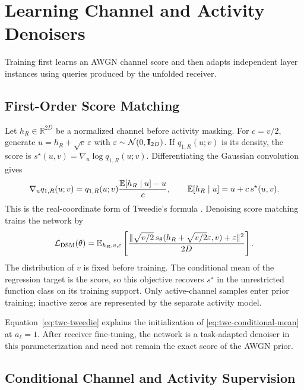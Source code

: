 \section{Learning Channel and Activity Denoisers}
\label{sec:learning}

Training first learns an AWGN channel score and then adapts independent
layer instances using queries produced by the unfolded receiver.

\subsection{First-Order Score Matching}

Let $h_R\in\mathbb R^{2D}$ be a normalized channel before activity
masking. For $c=v/2$, generate $u=h_R+\sqrt c\,\varepsilon$ with
$\varepsilon\sim\mathcal N(0,\mathbf{I}_{2D})$. If $q_{1,R}(u;v)$ is its
density, the score is $s^\star(u,v)=\nabla_u\log q_{1,R}(u;v)$.
Differentiating the Gaussian convolution gives
\begin{equation}
 \nabla_u q_{1,R}(u;v)
 =q_{1,R}(u;v)\frac{\mathbb{E}[h_R\mid u]-u}{c},\qquad
 \mathbb{E}[h_R\mid u]=u+c\,s^\star(u,v).
 \label{eq:twc-tweedie}
\end{equation}
This is the real-coordinate form of Tweedie's formula
\cite{efron2011,cai2026}. Denoising score matching
\cite{vincent2011,song2019} trains the network by
\begin{equation}
 \mathcal L_{\rm DSM}(\theta)=\mathbb{E}_{h_R,v,\varepsilon}
 \left[\frac{\|\sqrt{v/2}\,s_\theta(h_R+\sqrt{v/2}\varepsilon,v)
                      +\varepsilon\|^2}{2D}\right].
 \label{eq:twc-dsm}
\end{equation}
The distribution of $v$ is fixed before training. The conditional
mean of the regression target is the score, so this objective recovers
$s^\star$ in the unrestricted function class on its training support.
Only active-channel samples enter prior training; inactive zeros are
represented by the separate activity model.

Equation~\eqref{eq:twc-tweedie} explains the initialization of
\eqref{eq:twc-conditional-mean} at $a_\ell=1$. After receiver
fine-tuning, the network is a task-adapted denoiser in this
parameterization and need not remain the exact score of the AWGN prior.

\subsection{Conditional Channel and Activity Supervision}

